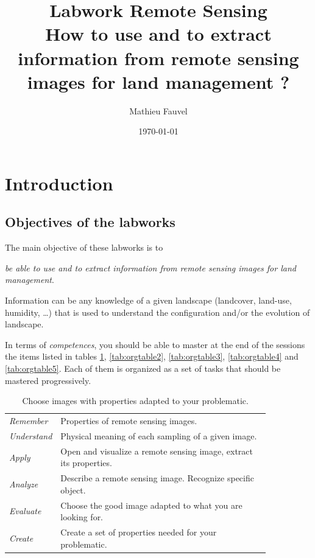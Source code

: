\documentclass[a4paper,11pt,DIV=18]{scrartcl}
\author{Mathieu Fauvel}
\date{\today}
\title{Labwork Remote Sensing\\\medskip
\large How to use and to extract information from remote sensing images for land management ?}
\begin{document}
\maketitle
\setcounter{tocdepth}{2}
\tableofcontents

\section{Introduction}
\label{sec:orgheadline9}
\subsection{Objectives of the labworks}
\label{sec:orgheadline1}
The main objective of these labworks is to
\begin{center}
\emph{be able to  use and to extract information from  remote sensing images
for land management}.
\end{center}
Information  can be  any knowledge  of a  given landscape  (landcover,
land-use, humidity, \ldots{})  that is used to understand the configuration
and/or the evolution of landscape.

In terms of  \emph{competences}, you should be  able to master at  the end of
the sessions  the items listed in  tables \ref{tab:orgtable1}, \ref{tab:orgtable2}, \ref{tab:orgtable3},  \ref{tab:orgtable4} and \ref{tab:orgtable5}.
Each of them  is organized as a  set of tasks that  should be mastered
progressively.

\begin{table}[htb]
\caption{\label{tab:orgtable1}
Choose images with properties adapted to your problematic.}
\centering
\begin{tabular}{lp{0.85\linewidth}}
\toprule
\emph{Remember} & Properties of remote sensing images.\\
\emph{Understand} & Physical meaning of each sampling of a given image.\\
\emph{Apply} & Open and visualize a remote sensing image, extract its properties.\\
\emph{Analyze} & Describe a remote sensing image. Recognize specific object.\\
\emph{Evaluate} & Choose the good image adapted to what you are looking for.\\
\emph{Create} & Create a set of properties needed for your problematic.\\
\bottomrule
\end{tabular}
\end{table}
\end{document}
